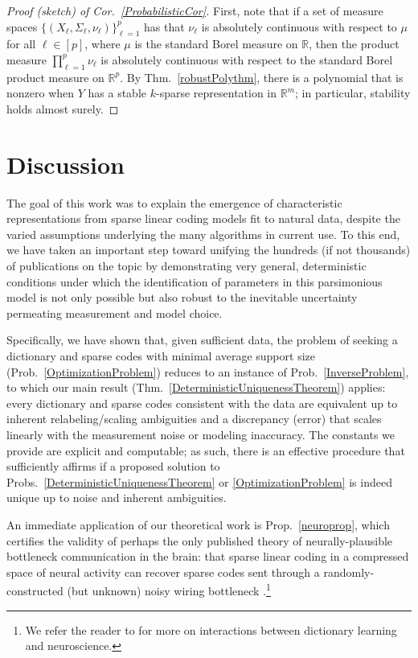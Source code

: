 \documentclass[9pt,twocolumn]{pnas-new}
\begin{document}
\begin{proof}[Proof (sketch) of Cor.~\ref{ProbabilisticCor}]
First, note that if a set of measure spaces $\{(X_{\ell}, \Sigma_{\ell}, \nu_{\ell})\}_{\ell=1}^p$ has that $\nu_{\ell}$ is absolutely continuous with respect to $\mu$ for all $\ell \in [p]$, where $\mu$ is the standard Borel measure on $\mathbb{R}$, then the product measure $\prod_{\ell=1}^p \nu_{\ell}$ is absolutely continuous with respect to the standard Borel product measure on $\mathbb{R}^p$. %
By Thm.~\ref{robustPolythm}, there is a polynomial that is nonzero when $Y$ has a stable $k$-sparse representation in $\mathbb{R}^m$; in particular, stability holds almost surely.
\end{proof}

\section{Discussion}\label{Discussion}

The goal of this work was to explain the emergence of characteristic representations from sparse linear coding models fit to natural data, despite the varied assumptions underlying the many algorithms in current use. To this end, we have taken an important step toward unifying the hundreds (if not thousands) of publications on the topic by demonstrating very general, deterministic conditions under which the identification of parameters in this parsimonious model is not only possible but also robust to the inevitable uncertainty permeating measurement and model choice.

Specifically, we have shown that, given sufficient data, the problem of seeking a dictionary and sparse codes with minimal average support size (Prob.~\ref{OptimizationProblem}) reduces to an instance of Prob.~\ref{InverseProblem}, to which our main result (Thm.~\ref{DeterministicUniquenessTheorem}) applies: every dictionary and sparse codes consistent with the data are equivalent up to inherent relabeling/scaling ambiguities and a discrepancy (error) that scales linearly with the measurement noise or modeling inaccuracy. The constants we provide are explicit and computable; as such, there is an effective procedure that sufficiently affirms if a proposed solution to Probs.~\ref{DeterministicUniquenessTheorem} or \ref{OptimizationProblem} is indeed unique up to noise and inherent ambiguities.

An immediate application of our theoretical work is Prop.~\ref{neuroprop}, which certifies the validity of perhaps the only published theory of neurally-plausible bottleneck communication in the brain: that sparse linear coding in a compressed space of neural activity can recover sparse codes sent through a randomly-constructed (but unknown) noisy wiring bottleneck \cite{Isely10}.\footnote{We refer the reader to \cite{ganguli2012compressed} for more on interactions between dictionary learning and neuroscience.}
\end{document}
